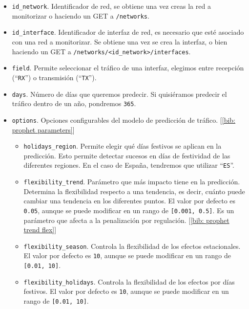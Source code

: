 \documentclass[a4paper, oneside, 12pt]{book}
\begin{document}
	\begin{itemize}
		\item \texttt{id\_network}. Identificador de red, se obtiene una vez creas la red a monitorizar o haciendo un GET a \texttt{/networks}.
		
		\item \texttt{id\_interface}. Identificador de interfaz de red, es necesario que esté asociado con una red a monitorizar. Se obtiene una vez se crea la interfaz, o bien haciendo un GET a \texttt{/networks/<id\_network>/interfaces}.
		
		\item \texttt{field}. Permite seleccionar el tráfico de una interfaz, elegimos entre recepción (``\texttt{RX}'') o transmisión (``\texttt{TX}'').
		
		\item \texttt{days}. Número de días que queremos predecir. Si quisiéramos predecir el tráfico dentro de un año, pondremos \texttt{365}.
		
		\item \texttt{options}. Opciones configurables del modelo de predicción de tráfico. [\ref{bib: prophet parameters}]
		
		\begin{itemize}
			\item \texttt{holidays\_region}. Permite elegir qué días festivos se aplican en la predicción. Esto permite detectar sucesos en días de festividad de las diferentes regiones. En el caso de España, tendremos que utilizar ``\texttt{ES}''.
			
			\item \texttt{flexibility\_trend}. Parámetro que más impacto tiene en la predicción. Determina la flexibilidad respecto a una tendencia, es decir, cuánto puede cambiar una tendencia en los diferentes puntos. El valor por defecto es \texttt{0.05}, aunque se puede modificar en un rango de \texttt{[0.001, 0.5]}. Es un parámetro que afecta a la penalización por regulación. [\ref{bib: prophet trend flex}]
			
			\item \texttt{flexibility\_season}. Controla la flexibilidad de los efectos estacionales. El valor por defecto es \texttt{10}, aunque se puede modificar en un rango de \texttt{[0.01, 10]}.
			
			\item \texttt{flexibility\_holidays}. Controla la flexibilidad de los efectos por días festivos. El valor por defecto es \texttt{10}, aunque se puede modificar en un rango de \texttt{[0.01, 10]}.
		\end{itemize}
	\end{itemize}
	
\end{document}
